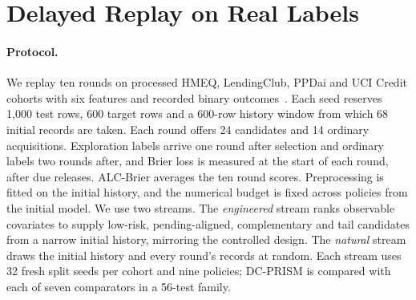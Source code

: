 \documentclass[runningheads]{llncs}
\begin{document}
\section{Delayed Replay on Real Labels}
\label{sec:replay}
\paragraph{Protocol.} We replay ten rounds on processed HMEQ, LendingClub, PPDai and UCI Credit cohorts with six features and recorded binary outcomes~\cite{sasHMEQ,lendingclubSource,ppdaiSource,yeh2009comparison}. Each seed reserves 1{,}000 test rows, 600 target rows and a 600-row history window from which 68 initial records are taken. Each round offers 24 candidates and 14 ordinary acquisitions. Exploration labels arrive one round after selection and ordinary labels two rounds after, and Brier loss is measured at the start of each round, after due releases. ALC-Brier averages the ten round scores. Preprocessing is fitted on the initial history, and the numerical budget is fixed across policies from the initial model. We use two streams. The \emph{engineered} stream ranks observable covariates to supply low-risk, pending-aligned, complementary and tail candidates from a narrow initial history, mirroring the controlled design. The \emph{natural} stream draws the initial history and every round's records at random. Each stream uses 32 fresh split seeds per cohort and nine policies; DC-PRISM is compared with each of seven comparators in a 56-test family.
\end{document}
